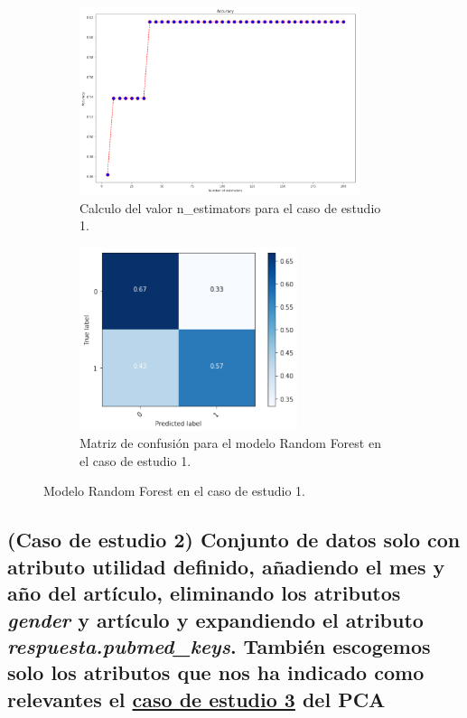 \begin{figure}[!htb]
    \begin{subfigure}[b]{0.45\linewidth}
    	\centering
	    \includegraphics[width=0.9\textwidth]{images/resultados_rf_ent_conjunto1.png}
    	\caption{Calculo del valor n\_estimators para el caso de estudio 1.}
		\label{rfTrainCase1}
	\end{subfigure}
	\begin{subfigure}[b]{0.45\linewidth} 
		\centering
		\includegraphics[width=0.7\textwidth]{images/resultados_rf_cm_conjunto1.png}
		\caption{Matriz de confusión para el modelo Random Forest en el caso de estudio 1.}
		\label{rfCMCase1}
	\end{subfigure}
	\caption{Modelo Random Forest en el caso de estudio 1.}
	\label{rfCase1}
\end{figure}

\subsection{(Caso de estudio 2) Conjunto de datos solo con atributo utilidad definido, añadiendo el mes y año del artículo, eliminando los atributos \textit{gender} y artículo y expandiendo el atributo \textit{respuesta.pubmed\_keys}. También escogemos solo los atributos que nos ha indicado como relevantes el \hyperref[result:pca_case3]{caso de estudio 3} del PCA}

